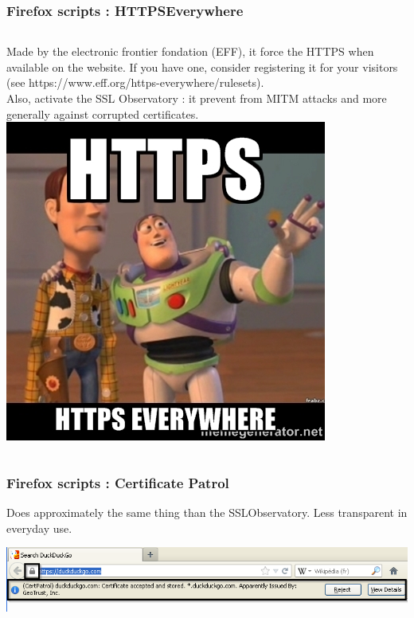 \begin{frame}
\frametitle{Firefox scripts : HTTPSEverywhere}
\begin{columns}[c]
Made by the electronic frontier fondation (EFF), it force the HTTPS when
available on the website. If you have one, consider registering it for your
visitors (see https://www.eff.org/https-everywhere/rulesets).
\\
Also, activate the SSL Observatory : it prevent from MITM attacks and more
generally against corrupted certificates.
\includegraphics[scale=0.4] {./materials/meme_httpseverywhere}
\end{columns}

\end{frame}
\begin{frame}
\frametitle{Firefox scripts : Certificate Patrol}
Does approximately the same thing than the SSLObservatory. Less transparent in
everyday use.
\begin{center}
\includegraphics[scale=0.4] {./materials/CertificatePatrol.png}
\end{center}
\end{frame}
